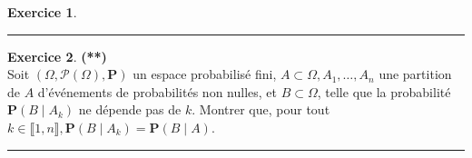 \documentclass[a4paper,11pt]{article}
\theoremstyle{definition}
\newtheorem{exo}{Exercice} %
\begin{document}
\begin{minipage}{1\linewidth}
\begin{minipage}[t]{0.48\linewidth}
\begin{exo}
			\centering\rule{1\linewidth}{0.6pt}\end{exo}
		
	\begin{exo}\textbf{(**)}\quad\\[0.2cm]
		
		Soit $(\Omega, \mathscr{P}(\Omega), \mathbf{P})$ un espace probabilisé fini, $A \subset \Omega, A_{1}, \ldots, A_{n}$ une partition de $A$ d'événements de probabilités non nulles, et $B \subset \Omega$, telle que la probabilité $\mathbf{P}\left(B \mid A_{k}\right)$ ne dépende pas de $k$. Montrer que, pour tout $k \in \llbracket 1, n \rrbracket, \mathbf{P}\left(B \mid A_{k}\right)=\mathbf{P}(B \mid A)$.
		
		
		\centering\rule{1\linewidth}{0.6pt}\end{exo}
		
		
		
		
\end{minipage}\end{minipage} \newpage
\end{document}

